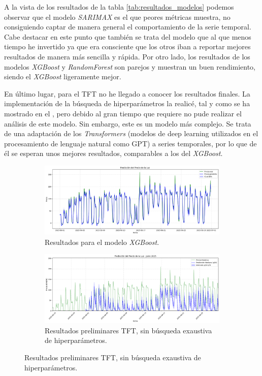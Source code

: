 A la vista de los resultados de la tabla \ref{tab:resultados_modelos} podemos observar que el modelo \textit{SARIMAX} es el que peores métricas muestra, no consiguiendo captar de manera general el comportamiento de la serie temporal. Cabe destacar en este punto que también se trata del modelo que al que menos tiempo he invertido ya que era consciente que los otros iban a reportar mejores resultados de manera más sencilla y rápida. Por otro lado, los resultados de los modelos \textit{XGBoost} y \textit{RandomForest} son parejos y muestran un buen rendimiento, siendo el \textit{XGBoost} ligeramente mejor.

En último lugar, para el TFT no he llegado a conocer los resultados finales. La implementación de la búsqueda de hiperparámetros la realicé, tal y como se ha mostrado en el , pero debido al gran tiempo que requiere no pude realizar el análisis de este modelo. Sin embargo, este es un modelo más complejo. Se trata de una adaptación de los \textit{Transformers} (modelos de deep learning utilizados en el procesamiento de lenguaje natural como GPT) a series temporales, por lo que de él se esperan unos mejores resultados, comparables a los del \textit{XGBoost}.

\begin{figure}[H]
\centering
\begin{subfigure}[b]{0.7\textwidth}
\centering
\includegraphics[width=\textwidth]{figuras/XGBoost_prediccion.png}
\caption[Resultados \textit{XGBoost}]{Resultados para el modelo \textit{XGBoost}.}
\label{ResultadosXGBoost}
\end{subfigure}
\begin{subfigure}[b]{0.7\textwidth}
\centering
\includegraphics[width=\textwidth]{figuras/TFT_predCon1.png}
\caption[Resultados preliminares TFT.]{Resultados preliminares TFT, sin búsqueda exaustiva de hiperparámetros.}
\label{ResultadosTFT}
\end{subfigure}
\end{figure}



